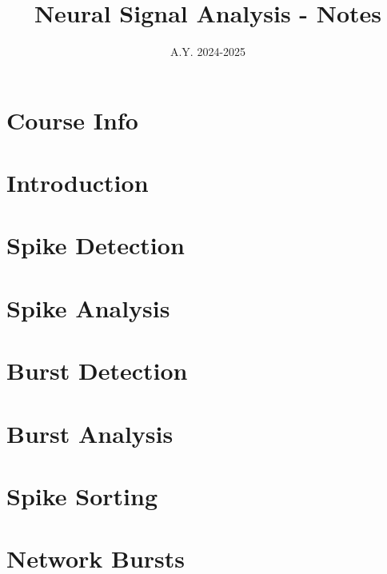 \documentclass[12pt]{article}
\title{Neural Signal Analysis - Notes}
\date{A.Y. 2024-2025}
\begin{document}
\maketitle

\tableofcontents
\newpage

\section*{Course Info}

\newpage

\setcounter{section}{0}
\section{Introduction}
\graphicspath{ {./images/1/} }

\newpage

\section{Spike Detection}
\graphicspath{ {./images/2/} }

\newpage

\section{Spike Analysis}
\graphicspath{ {./images/4/} }

\newpage

\section{Burst Detection}
\graphicspath{ {./images/5/} }

\newpage

\section{Burst Analysis}
\graphicspath{ {./images/6/}{./images/8/} }

\newpage

\section{Spike Sorting}
\graphicspath{ {./images/3/} }

\newpage

\section{Network Bursts}
\graphicspath{ {./images/7/} }

\newpage
\end{document}
